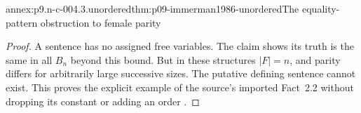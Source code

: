 \begin{annexitem}{annex:p9.n-c-004.3.unordered}{thm:p09-immerman1986-unordered}{The equality-pattern obstruction to female parity}
\begin{proof}
A sentence has no assigned free variables.  The claim shows its truth
is the same in all \(B_n\) beyond this bound.  But in these
structures \(\lvert F\rvert=n\), and parity differs for
arbitrarily large successive sizes.  The putative defining sentence
cannot exist.  This proves the explicit example of the source's
imported Fact~2.2 without dropping its constant or adding an order
\cite[sec.~2]{Immerman1986}.
\end{proof}
\end{annexitem}

